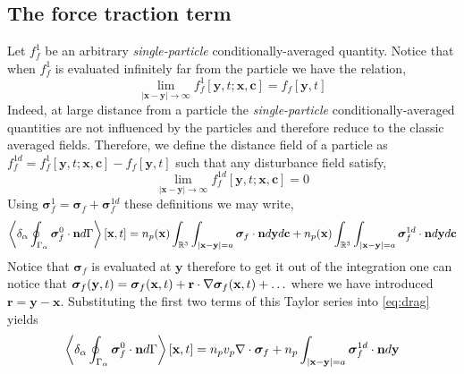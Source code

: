 
\subsection{The force traction term}

Let $f^1_f$ be an arbitrary \textit{single-particle} conditionally-averaged quantity. 
Notice that when $f^1_f$ is evaluated infinitely far from the particle we have the relation, 
\begin{equation*}
    \lim_{|\textbf{x} - \textbf{y}| \to \infty}  f^1_f [\textbf{y},t;\textbf{x},\textbf{c}] = f_f [\textbf{y},t]
\end{equation*}
Indeed, at large distance from a particle the \textit{single-particle} conditionally-averaged quantities are not influenced by the particles and therefore reduce to the classic averaged fields. 
Therefore, we define the distance field of a particle as $f^{1d}_f = f^1_f [\textbf{y},t;\textbf{x},\textbf{c}]  - f_f[\textbf{y},t]$ such that any disturbance field satisfy, 
\begin{equation*}
    \lim_{|\textbf{x} - \textbf{y}| \to \infty}  f^{1d}_f [\textbf{y},t;\textbf{x},\textbf{c}] = 0 
\end{equation*}
Using  $\bm\sigma_f^1 = \bm\sigma_f + \bm\sigma_f^{1d}$ these definitions we may write, 
\begin{equation}
    \left<\delta_\alpha \oint_{\Gamma_\alpha} \bm\sigma_f^0\cdot\textbf{n} d\Gamma\right>[\textbf{x},t]
    =
    n_p(\textbf{x})
    \int_{\mathbb{R}^3}
    \int_{|\textbf{x}-\textbf{y}|=a}
    \bm\sigma_f
    \cdot \textbf{n}
    d\textbf{y}
    d\textbf{c}
    + n_p(\textbf{x})
    \int_{\mathbb{R}^3}
    \int_{|\textbf{x}-\textbf{y}|=a}
    \bm\sigma_f^{1d}
    \cdot \textbf{n}
    d\textbf{y}
    d\textbf{c}
    \label{eq:drag}
\end{equation}
Notice that $\bm\sigma_f$ is evaluated at $\textbf{y}$ therefore to get it out of the integration one can notice that $\bm\sigma_f(\textbf{y},t) = \bm\sigma_f(\textbf{x},t) + \textbf{r}\cdot \mathbf{\nabla}\bm\sigma_f(\textbf{x},t)+ \ldots$
where we have introduced $\textbf{r} = \textbf{y} - \textbf{x}$. 
Substituting the first two terms of this Taylor series into \ref{eq:drag} yields
\begin{equation}
    \left<\delta_\alpha \oint_{\Gamma_\alpha} \bm\sigma_f^0\cdot\textbf{n} d\Gamma\right>[\textbf{x},t]
    =
    n_p v_p 
    \mathbf{\nabla}\cdot\bm\sigma_f
    +
    n_p 
    \int_{|\textbf{x}-\textbf{y}|=a}
    \bm\sigma_f^{1d} \cdot \textbf{n}
    d\textbf{y}
    \label{eq:drag_final}
\end{equation}
